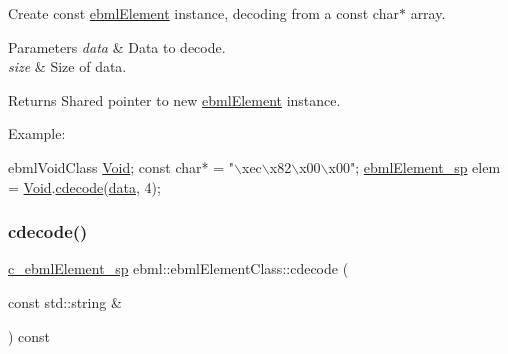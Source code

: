 Create const \mbox{\hyperlink{classebml_1_1ebmlElement}{ebml\+Element}} instance, decoding from a const char$\ast$ array.


\begin{DoxyParams}{Parameters}
{\em data} & Data to decode. \\
\hline
{\em size} & Size of \textquotesingle{}data\textquotesingle{}. \\
\hline
\end{DoxyParams}
\begin{DoxyReturn}{Returns}
Shared pointer to new \mbox{\hyperlink{classebml_1_1ebmlElement}{ebml\+Element}} instance.
\end{DoxyReturn}
Example\+: 
\begin{DoxyCode}
ebmlVoidClass \mbox{\hyperlink{namespaceebml_afbfd509d1cb71e416a07253746e886e9}{Void}};
\textcolor{keyword}{const} \textcolor{keywordtype}{char}* = \textcolor{stringliteral}{"\(\backslash\)xec\(\backslash\)x82\(\backslash\)x00\(\backslash\)x00"};
\mbox{\hyperlink{namespaceebml_adad533b7705a16bb360fe56380c5e7be}{ebmlElement\_sp}} elem = \mbox{\hyperlink{namespaceebml_afbfd509d1cb71e416a07253746e886e9}{Void}}.\mbox{\hyperlink{classebml_1_1ebmlElementClass_ad44d7844db705e5e1d8c35a780b58486}{cdecode}}(\mbox{\hyperlink{namespaceebml_a6365629b3110a3c5d0cde94d08aac26c}{data}}, 4);
\end{DoxyCode}
 \mbox{\label{classebml_1_1ebmlElementClass_a2696f361d3cf6f1f544657266ad21808}} 
\subsubsection{\texorpdfstring{cdecode()}{cdecode()}\hspace{0.1cm}{\footnotesize\ttfamily [4/6]}}
{\footnotesize\ttfamily \mbox{\hyperlink{namespaceebml_a2deef4e8071531b32e3533f1bf978917}{c\+\_\+ebml\+Element\+\_\+sp}} ebml\+::ebml\+Element\+Class\+::cdecode (\begin{DoxyParamCaption}\item[{const std\+::string \&}]{ }\end{DoxyParamCaption}) const}

\mbox{\label{classebml_1_1ebmlElementClass_a01de47338b3df5a666b989d9d85fa1d5}} 
